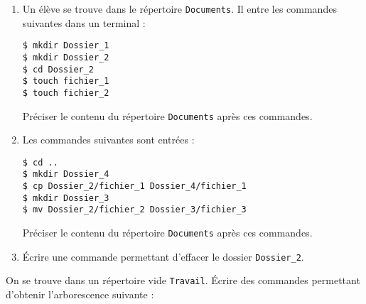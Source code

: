 \documentclass[a4paper,dvipsnames]{article}
\begin{document}
\begin{exercice}{}{}
  \begin{enumerate}
    \item Un élève se trouve dans le répertoire \texttt{Documents}. Il entre les commandes suivantes dans un terminal :

      \begin{verbatim}
$ mkdir Dossier_1
$ mkdir Dossier_2
$ cd Dossier_2
$ touch fichier_1
$ touch fichier_2
      \end{verbatim}

      Préciser le contenu du répertoire \texttt{Documents} après ces commandes.
    \item Les commandes suivantes sont entrées :

      \begin{verbatim}
$ cd ..
$ mkdir Dossier_4
$ cp Dossier_2/fichier_1 Dossier_4/fichier_1
$ mkdir Dossier_3
$ mv Dossier_2/fichier_2 Dossier_3/fichier_3
      \end{verbatim}

      Préciser le contenu du répertoire \texttt{Documents} après ces commandes.
    \item Écrire une commande permettant d'effacer le dossier \texttt{Dossier_2}.
  \end{enumerate}
\end{exercice}

\smallskip

\begin{exercice}{}{}
  On se trouve dans un répertoire vide \texttt{Travail}. Écrire des commandes permettant d'obtenir l'arborescence suivante :
  
  \bigskip


\end{exercice}
\end{document}
